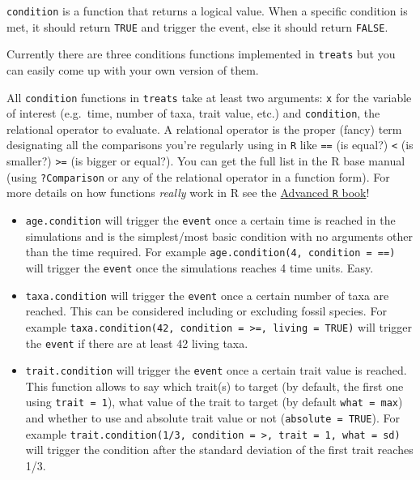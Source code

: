 \documentclass[
]{book}
\providecommand{\tightlist}{%
  \setlength{\itemsep}{0pt}\setlength{\parskip}{0pt}}
\begin{document}
\texttt{condition} is a function that returns a logical value. When a specific condition is met, it should return \texttt{TRUE} and trigger the event, else it should return \texttt{FALSE}.

Currently there are three conditions functions implemented in \texttt{treats} but you can easily come up with your own version of them.

All \texttt{condition} functions in \texttt{treats} take at least two arguments: \texttt{x} for the variable of interest (e.g.~time, number of taxa, trait value, etc.) and \texttt{condition}, the relational operator to evaluate. A relational operator is the proper (fancy) term designating all the comparisons you're regularly using in \texttt{R} like \texttt{==} (is equal?) \texttt{\textless{}} (is smaller?) \texttt{\textgreater{}=} (is bigger or equal?). You can get the full list in the R base manual (using \texttt{?Comparison} or any of the relational operator in a function form). For more details on how functions \emph{really} work in R see the \href{https://adv-r.hadley.nz/functions.html}{Advanced \texttt{R} book}!

\begin{itemize}
\tightlist
\item
  \texttt{age.condition} will trigger the \texttt{event} once a certain time is reached in the simulations and is the simplest/most basic condition with no arguments other than the time required. For example \texttt{age.condition(4,\ condition\ =\ \textasciigrave{}==\textasciigrave{})} will trigger the \texttt{event} once the simulations reaches 4 time units. Easy.
\item
  \texttt{taxa.condition} will trigger the \texttt{event} once a certain number of taxa are reached. This can be considered including or excluding fossil species. For example \texttt{taxa.condition(42,\ condition\ =\ \textasciigrave{}\textgreater{}=\textasciigrave{},\ living\ =\ TRUE)} will trigger the \texttt{event} if there are at least 42 living taxa.
\item
  \texttt{trait.condition} will trigger the \texttt{event} once a certain trait value is reached. This function allows to say which trait(s) to target (by default, the first one using \texttt{trait\ =\ 1}), what value of the trait to target (by default \texttt{what\ =\ max}) and whether to use and absolute trait value or not (\texttt{absolute\ =\ TRUE}). For example \texttt{trait.condition(1/3,\ condition\ =\ \textasciigrave{}\textgreater{}\textasciigrave{},\ trait\ =\ 1,\ what\ =\ sd)} will trigger the condition after the standard deviation of the first trait reaches 1/3.
\end{itemize}
\end{document}
